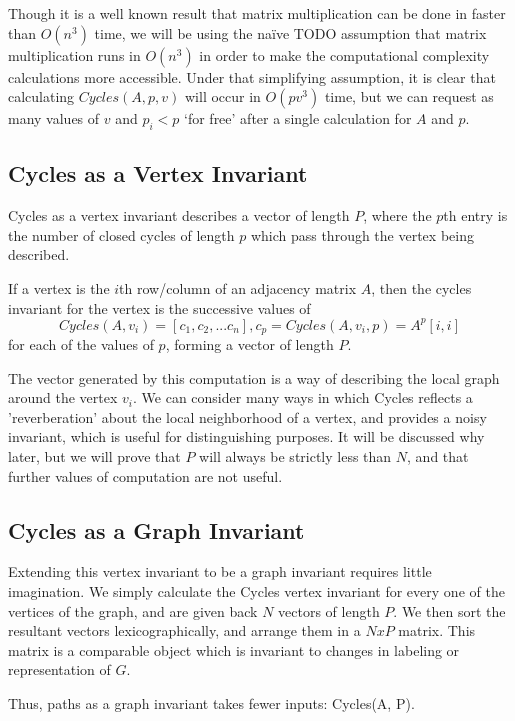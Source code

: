 \documentclass[11pt,a4paper]{report}
\begin{document}
Though it is a well known result that matrix multiplication can be done in faster than $O(n^3)$ time, we will be using the na\"{i}ve TODO assumption that matrix multiplication runs in $O(n^3)$ in order to make the computational complexity calculations more accessible.  
Under that simplifying assumption, it is clear that calculating $Cycles(A, p, v)$ will occur in $O(pv^3)$ time, but we can request as many values of $v$ and $p_i < p$ `for free' after a single calculation for $A$ and $p$.

\subsection{Cycles as a Vertex Invariant}

Cycles as a vertex invariant describes a vector of length $P$, where the $p$th entry is the number of closed cycles of length $p$ which pass through the vertex being described.

If a vertex is the $i$th row/column of an adjacency matrix $A$, then the cycles invariant for the vertex is the successive values of 
$$Cycles(A, v_i) = [c_1, c_2, ... c_n] , c_p = Cycles(A, v_i, p) = A^p[i,i]$$
for each of the values of $p$, forming a vector of length $P$.

The vector generated by this computation is a way of describing the local graph around the vertex $v_i$.
We can consider many ways in which Cycles reflects a 'reverberation' about the local neighborhood of a vertex, and provides a noisy invariant, which is useful for distinguishing purposes. 
It will be discussed why later, but we will prove that $P$ will always be strictly less than $N$, and that further values of computation are not useful.

\subsection{Cycles as a Graph Invariant}

Extending this vertex invariant to be a graph invariant requires little imagination. 
We simply calculate the Cycles vertex invariant for every one of the vertices of the graph, and are given back $N$ vectors of length $P$.
We then sort the resultant vectors lexicographically, and arrange them in a $NxP$ matrix.
This matrix is a comparable object which is invariant to changes in labeling or representation of $G$.

Thus, paths as a graph invariant takes fewer inputs: Cycles(A, P).
\end{document}
